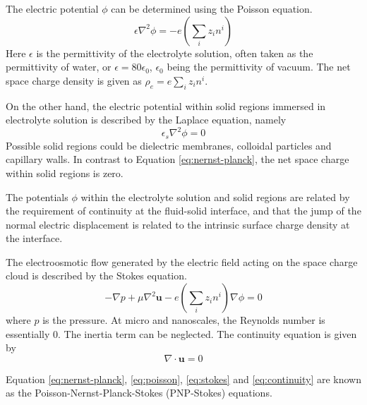 The electric potential $\phi$ can be determined using the Poisson equation.
\begin{equation}
\epsilon \nabla^2 \phi = -e\left( \sum_i z_i n^i \right) 
\label{eq:poisson}
\end{equation} 
Here $\epsilon$ is the permittivity of the electrolyte solution, often taken as the permittivity of water, or $\epsilon = 80\epsilon_0$, $\epsilon_0$ being the permittivity of vacuum. The net space charge density is given as $\rho_e = e\sum_i z_i n^i$.

On the other hand, the electric potential within solid regions immersed in electrolyte solution is described by the Laplace equation, namely
\begin{equation}
\epsilon_s \nabla^2 \phi = 0
\label{eq:laplace}
\end{equation}
Possible solid regions could be dielectric membranes, colloidal particles and capillary walls. In contrast to Equation \ref{eq:nernst-planck}, the net space charge within solid regions is zero.

The potentials $\phi$ within the electrolyte solution and solid regions are related by the requirement of continuity at the fluid-solid interface, and that the jump of the normal electric displacement is related to the intrinsic surface charge density at the interface.

The electroosmotic flow generated by the electric field acting on the space charge cloud is described by the Stokes equation.
\begin{equation}
-\nabla p + \mu\nabla^2\mathbf{u} - e\left( \sum_i z_i n^i \right) \nabla\phi = 0
\label{eq:stokes}
\end{equation}
where $p$ is the pressure. At micro and nanoscales, the Reynolds number is essentially 0. The inertia term can be neglected. The continuity equation is given by
\begin{equation}
\nabla \cdot \mathbf{u} = 0
\label{eq:continuity}
\end{equation}

Equation \ref{eq:nernst-planck}, \ref{eq:poisson}, \ref{eq:stokes} and \ref{eq:continuity} are known as the Poisson-Nernst-Planck-Stokes (PNP-Stokes) equations.

